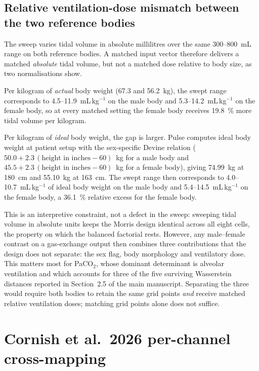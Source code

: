 \documentclass[pdflatex,sn-nature]{sn-jnl}%
\newcommand{\mainref}[2]{#2}
\begin{document}
\subsection{Relative ventilation-dose mismatch between the two reference bodies}\label{sec:s6-dose}

The sweep varies tidal volume in absolute millilitres over the same 300--800~mL range on both reference bodies. A matched input vector therefore delivers a matched \emph{absolute} tidal volume, but not a matched dose relative to body size, as two normalisations show.

Per kilogram of \emph{actual} body weight (67.3 and 56.2~kg), the swept range corresponds to 4.5--11.9~mL\,kg$^{-1}$ on the male body and 5.3--14.2~mL\,kg$^{-1}$ on the female body, so at every matched setting the female body receives 19.8~\% more tidal volume per kilogram.

Per kilogram of \emph{ideal} body weight, the gap is larger. Pulse computes ideal body weight at patient setup with the sex-specific Devine relation ($50.0 + 2.3\,(\text{height in inches} - 60)$~kg for a male body and $45.5 + 2.3\,(\text{height in inches} - 60)$~kg for a female body), giving 74.99~kg at 180~cm and 55.10~kg at 163~cm. The swept range then corresponds to 4.0--10.7~mL\,kg$^{-1}$ of ideal body weight on the male body and 5.4--14.5~mL\,kg$^{-1}$ on the female body, a 36.1~\% relative excess for the female body.

This is an interpretive constraint, not a defect in the sweep: sweeping tidal volume in absolute units keeps the Morris design identical across all eight cells, the property on which the balanced factorial rests. However, any male--female contrast on a gas-exchange output then combines three contributions that the design does not separate: the sex flag, body morphology and ventilatory dose. This matters most for PaCO$_2$, whose dominant determinant is alveolar ventilation and which accounts for three of the five surviving Wasserstein distances reported in Section~\mainref{sec:results-sex}{2.5} of the main manuscript. Separating the three would require both bodies to retain the same grid points \emph{and} receive matched relative ventilation doses; matching grid points alone does not suffice.


\section{Cornish et al.\ 2026 per-channel cross-mapping}\label{sec:s7}
\end{document}

